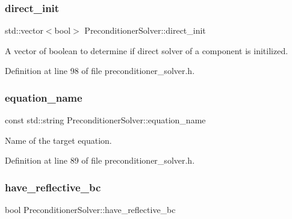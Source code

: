 \subsubsection{\texorpdfstring{direct\+\_\+init}{direct\_init}}
{\footnotesize\ttfamily std\+::vector$<$bool$>$ Preconditioner\+Solver\+::direct\+\_\+init\hspace{0.3cm}{\ttfamily [private]}}



A vector of boolean to determine if direct solver of a component is initilized. 



Definition at line 98 of file preconditioner\+\_\+solver.\+h.

\mbox{\label{class_preconditioner_solver_af20758bf54111e7092c49688622b1e54}} 
\subsubsection{\texorpdfstring{equation\+\_\+name}{equation\_name}}
{\footnotesize\ttfamily const std\+::string Preconditioner\+Solver\+::equation\+\_\+name\hspace{0.3cm}{\ttfamily [private]}}



Name of the target equation. 



Definition at line 89 of file preconditioner\+\_\+solver.\+h.

\mbox{\label{class_preconditioner_solver_a954ef4f8c7d8206b277280a4b41aa9b1}} 
\subsubsection{\texorpdfstring{have\+\_\+reflective\+\_\+bc}{have\_reflective\_bc}}
{\footnotesize\ttfamily bool Preconditioner\+Solver\+::have\+\_\+reflective\+\_\+bc\hspace{0.3cm}{\ttfamily [private]}}



